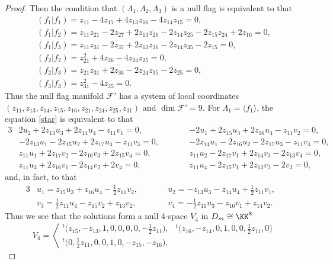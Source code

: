 \begin{proof}
Then the condition that $(\Lambda_1, \Lambda_2, \Lambda_3)$ is a null flag is equivalent to that
\begin{gather*}
(f_1 \vert f_1) = z_{11} - 4z_{17} + 4z_{13}z_{16} - 4z_{14}z_{15} = 0,
\\
(f_1 \vert f_2) = z_{11}z_{21} - 2z_{27} + 2z_{13}z_{26} - 2z_{14}z_{25} - 2z_{15}z_{24} + 2z_{16} = 0,
\\
(f_1 \vert f_3) = z_{11}z_{31} - 2z_{37} + 2z_{13}z_{36} - 2z_{14}z_{35} - 2z_{15} = 0,
\\
(f_2 \vert f_2) = z_{21}^2 + 4z_{26} - 4z_{24}z_{25} = 0,
\\
(f_2 \vert f_3) = z_{21}z_{31} + 2z_{36} - 2z_{24}z_{35} - 2z_{25} = 0,
\\
(f_3 \vert f_3) = z_{31}^2 - 4z_{35} = 0.
\end{gather*}
Thus the null flag manifold ${\mathcal F}'$ has a system of local coordinates $(z_{11}, z_{13}, z_{14}, z_{15}, z_{16}, z_{21}, z_{24},\allowbreak z_{25}, z_{31})$ and $\dim {\mathcal F}' = 9$.
For $\Lambda_1 = \langle f_1\rangle$, the equation \eqref{star} is equivalent to that
\begin{alignat*}{3}
&2u_2 + 2z_{13}u_3 + 2z_{14}u_4 - z_{11}v_1 = 0,
\qquad&&
-2u_1 + 2z_{15}u_3 + 2z_{16}u_4 - z_{11}v_2 = 0,&
\\
&-2z_{13}u_1 - 2z_{15}u_2 + 2z_{17}u_4 - z_{11}v_3 = 0,
\qquad&&
-2z_{14}u_1 - 2z_{16}u_2 - 2z_{17}u_3 - z_{11}v_4 = 0,&
\\
&z_{11}u_1 + 2z_{17}v_2 - 2z_{16}v_3 + 2z_{15}v_4 = 0,
\qquad&&
z_{11}u_2 - 2z_{17}v_1 + 2z_{14}v_3 - 2z_{13}v_4 = 0,&
\\
&z_{11}u_3 + 2z_{16}v_1 - 2z_{14}v_2 + 2v_4 = 0,
\qquad&&
z_{11}u_4 - 2z_{15}v_1 + 2z_{13}v_2 - 2v_3 = 0,&
\end{alignat*}
and, in fact, to that
\begin{alignat*}{3}
&u_1 = z_{15}u_3 + z_{16}u_4 - \frac{1}{2}z_{11}v_2, \qquad&&
u_2 = -z_{13}u_3 - z_{14}u_4 + \frac{1}{2}z_{11}v_1,&
\\
&v_3 = \frac{1}{2}z_{11}u_4 - z_{15}v_2 + z_{13}v_2, \qquad&&
v_4 = - \frac{1}{2}z_{11}u_3 - z_{16}v_1 + z_{14}v_2.&
\end{alignat*}
Thus we see that the solutions form a null $4$-space $V_4$ in $D_m \cong \KK^8$
\[
V_4 = \left\langle
\begin{matrix}
{}^t\bigl(z_{15}, - z_{13}, 1, 0, 0, 0, 0, - \frac{1}{2}z_{11}\bigr), &
{}^t\bigl(z_{16}, - z_{14}, 0, 1, 0, 0, \frac{1}{2}z_{11}, 0\bigr)
\\
{}^t\bigl(0, \frac{1}{2}z_{11}, 0, 0, 1, 0, - z_{15}, - z_{16}\bigr), &

\end{matrix}\]
\end{proof}
